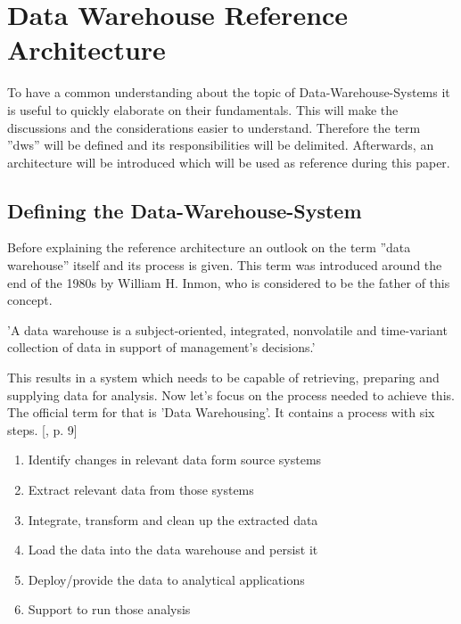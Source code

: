 \section{Data Warehouse Reference Architecture}
\label{sec:referenceArchitecture}
To have a common understanding about the topic of Data-Warehouse-Systems it is useful to quickly elaborate on their fundamentals. This will make the discussions and the considerations easier to understand.\newline
Therefore the term ''\acrshort{dws}'' will be defined and its responsibilities will be delimited. Afterwards, an architecture will be introduced which will be used as reference during this paper.

\subsection{Defining the Data-Warehouse-System}
Before explaining the reference architecture an outlook on the term ''data warehouse'' itself and its process is given.\newline
This term was introduced around the end of the 1980s by William H. Inmon, who is considered to be the father of this concept.
\begin{definition}
'A data warehouse is a subject-oriented, integrated, nonvolatile and time-variant collection of data in support of management's decisions.' \cite{buildingTheDWS}
\end{definition}
This results in a system which needs to be capable of retrieving, preparing and supplying data for analysis.\newline
Now let's focus on the process needed to achieve this. The official term for that is 'Data Warehousing'. It contains a process with six steps. [\cite{dwsRefArchitecture}, p. 9]
\begin{enumerate}
    \item Identify changes in relevant data form source systems
    \item Extract relevant data from those systems
    \item Integrate, transform and clean up the extracted data
    \item Load the data into the data warehouse and persist it
    \item Deploy/provide the data to analytical applications 
    \item Support to run those analysis
\end{enumerate}

